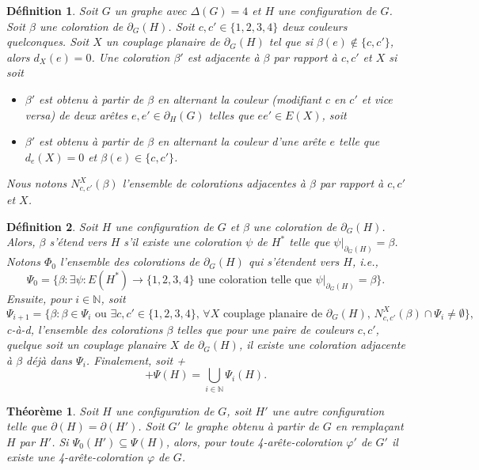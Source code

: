 \documentclass[10pt,a4paper]{article}
\newtheorem{definition}{Définition}
\newtheorem{theorem}{Théorème}
\begin{document}
\begin{definition}
Soit $G$ un graphe avec $\Delta(G)=4$ et $H$ une configuration de $G$.
Soit $\beta$ une coloration de $\partial_G(H)$. Soit $c,c'\in \{1,2,3,4\}$ deux couleurs quelconques. Soit $X$ un couplage planaire de $\partial_G(H)$ tel que si $\beta(e)\notin \{c,c'\}$, alors $d_X(e)=0$. Une coloration $\beta'$ est \emph{adjacente} à $\beta$ par rapport à $c,c'$ et $X$ si soit
\begin{itemize}
\item $\beta'$ est obtenu à partir de $\beta$ en alternant la couleur (modifiant $c$ en $c'$ et vice versa) de deux arêtes $e,e'\in \partial_H(G)$ telles que $ee'\in E(X)$, soit
\item $\beta'$ est obtenu à partir de $\beta$ en alternant la couleur d'une arête $e$ telle que $d_e(X)=0$ et $\beta(e)\in\{c,c'\}$.
\end{itemize}
Nous notons $N^X_{c,c'}(\beta)$ l'ensemble de colorations adjacentes à $\beta$ par rapport à $c,c'$ et $X$.
\end{definition}

\begin{definition}
Soit $H$ une configuration de $G$ et $\beta$ une coloration de $\partial_G(H)$. Alors, $\beta$ \emph{s'étend} vers $H$ s'il existe une coloration $\psi$ de $H^*$ telle que $\psi|_{\partial_G(H)} = \beta$. Notons $\Phi_0$ l'ensemble des colorations de $\partial_G(H)$ qui s'étendent vers $H$, i.e.,
$$
\Psi_0 = \{\beta : \exists \psi : E(H^*)\to\{1,2,3,4\} \textrm{ une coloration telle que } \psi|_{\partial_G(H)} = \beta\}.
$$
Ensuite, pour $i\in\mathbb{N}$, soit
$$
\Psi_{i+1} = 
\{ 
\beta : 
\beta\in \Psi_i
\textrm{ ou }
\exists c,c'\in \{1,2,3,4\},\, 
\forall X\textrm{ couplage planaire de $\partial_G(H)$, }
N^X_{c,c'}(\beta) \cap \Psi_i \neq \emptyset 
\},
$$
c-à-d, l'ensemble des colorations $\beta$ telles que pour une paire de couleurs $c,c'$, quelque soit un couplage planaire $X$ de $\partial_G(H)$, il existe une coloration adjacente à $\beta$ déjà dans $\Psi_{i}$. Finalement, soit
 +$$
 +\Psi(H)=\bigcup_{i\in \mathbb{N}} \Psi_i(H).
$$
\end{definition}

\begin{theorem}
Soit $H$ une configuration de $G$, soit $H'$ une autre configuration telle que $\partial(H)=\partial(H')$. Soit $G'$ le graphe obtenu à partir de $G$ en remplaçant $H$ par $H'$.
Si $\Psi_0(H')\subseteq \Psi(H)$, alors, pour toute 4-arête-coloration $\varphi'$ de $G'$ il existe une 4-arête-coloration $\varphi$ de $G$.
\label{th:red}
\end{theorem}
\end{document}
